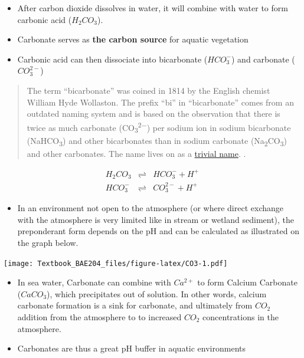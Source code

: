 \documentclass[]{book}
\providecommand{\tightlist}{%
  \setlength{\itemsep}{0pt}\setlength{\parskip}{0pt}}
\theoremstyle{definition}
\theoremstyle{definition}
\theoremstyle{definition}
\theoremstyle{remark}
\begin{document}
\begin{itemize}
\tightlist
\item
  After carbon dioxide dissolves in water, it will combine with water to
  form carbonic acid (\(H_2CO_3\)).
\item
  Carbonate serves as \textbf{the carbon source} for aquatic vegetation
\item
  Carbonic acid can then dissociate into bicarbonate (\(HCO_3^-\)) and
  carbonate (\(CO_3^{2-}\))
\end{itemize}

\begin{quote}
The term ``bicarbonate'' was coined in 1814 by the English chemist
William Hyde Wollaston. The prefix ``bi'' in ``bicarbonate'' comes from
an outdated naming system and is based on the observation that there is
twice as much carbonate (CO\textsubscript{3}\textsuperscript{2−}) per
sodium ion in sodium bicarbonate (NaHCO\textsubscript{3}) and other
bicarbonates than in sodium carbonate
(Na\textsubscript{2}CO\textsubscript{3}) and other carbonates. The name
lives on as a \href{https://en.wikipedia.org/wiki/Trivial_name}{trivial
name}. \citep{Wikipedia_contributors2018-lc}.
\end{quote}

\begin{align}
H_2CO_3  & \rightleftharpoons & HCO_3^- + H^+  \label{eq:H2CO3} \\
HCO_3^- & \rightleftharpoons & CO_3^{2-} + H^+ \label{eq:HCO3}
\end{align}

\begin{itemize}
\tightlist
\item
  In an environment not open to the atmosphere (or where direct exchange
  with the atmosphere is very limited like in stream or wetland
  sediment), the preponderant form depends on the pH and can be
  calculated as illustrated on the graph below.
\end{itemize}

\texttt{[image: Textbook\_BAE204\_files/figure-latex/CO3-1.pdf]}

\begin{itemize}
\tightlist
\item
  In sea water, Carbonate can combine with \(Ca^{2+}\) to form Calcium
  Carbonate (\(CaCO_3\)), which precipitates out of solution. In other
  words, calcium carbonate formation is a sink for carbonate, and
  ultimately from \(CO_2\) addition from the atmosphere to to increased
  \(CO_2\) concentrations in the atmosphere.
\item
  Carbonates are thus a great pH buffer in aquatic environments
\end{itemize}
\end{document}
